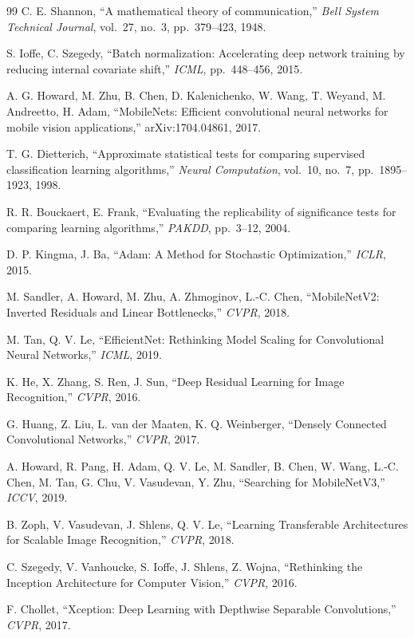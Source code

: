 \documentclass[12pt,a4paper]{article}
\begin{document}
\begin{thebibliography}{99}
C. E. Shannon,
``A mathematical theory of communication,''
\emph{Bell System Technical Journal}, vol.~27, no.~3, pp.~379--423, 1948.

S. Ioffe, C. Szegedy,
``Batch normalization: Accelerating deep network training by reducing
internal covariate shift,''
\emph{ICML}, pp.~448--456, 2015.

A. G. Howard, M. Zhu, B. Chen, D. Kalenichenko, W. Wang, T. Weyand,
M. Andreetto, H. Adam,
``MobileNets: Efficient convolutional neural networks for mobile vision
applications,''
arXiv:1704.04861, 2017.

T. G. Dietterich,
``Approximate statistical tests for comparing supervised classification
learning algorithms,''
\emph{Neural Computation}, vol.~10, no.~7, pp.~1895--1923, 1998.

R. R. Bouckaert, E. Frank,
``Evaluating the replicability of significance tests for comparing
learning algorithms,''
\emph{PAKDD}, pp.~3--12, 2004.

D. P. Kingma, J. Ba,
``Adam: A Method for Stochastic Optimization,''
\emph{ICLR}, 2015.

M. Sandler, A. Howard, M. Zhu, A. Zhmoginov, L.-C. Chen,
``MobileNetV2: Inverted Residuals and Linear Bottlenecks,''
\emph{CVPR}, 2018.

M. Tan, Q. V. Le,
``EfficientNet: Rethinking Model Scaling for Convolutional Neural Networks,''
\emph{ICML}, 2019.

K. He, X. Zhang, S. Ren, J. Sun,
``Deep Residual Learning for Image Recognition,''
\emph{CVPR}, 2016.

G. Huang, Z. Liu, L. van der Maaten, K. Q. Weinberger,
``Densely Connected Convolutional Networks,''
\emph{CVPR}, 2017.

A. Howard, R. Pang, H. Adam, Q. V. Le, M. Sandler, B. Chen,
W. Wang, L.-C. Chen, M. Tan, G. Chu, V. Vasudevan, Y. Zhu,
``Searching for MobileNetV3,''
\emph{ICCV}, 2019.

B. Zoph, V. Vasudevan, J. Shlens, Q. V. Le,
``Learning Transferable Architectures for Scalable Image Recognition,''
\emph{CVPR}, 2018.

C. Szegedy, V. Vanhoucke, S. Ioffe, J. Shlens, Z. Wojna,
``Rethinking the Inception Architecture for Computer Vision,''
\emph{CVPR}, 2016.

F. Chollet,
``Xception: Deep Learning with Depthwise Separable Convolutions,''
\emph{CVPR}, 2017.

\end{thebibliography}
\end{document}
